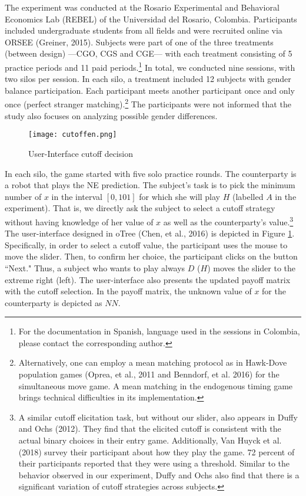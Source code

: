 \documentclass[12pt,english]{article}
\begin{document}
The experiment was conducted at the Rosario Experimental and Behavioral Economics Lab (REBEL) of the Universidad del Rosario, Colombia. Participants included undergraduate students from all fields and were recruited online via ORSEE (Greiner, 2015). Subjects were part of one of the three treatments (between design) ---CGO, CGS and CGE---  with each treatment consisting of 5 practice periods and 11 paid periods.\footnote{For the documentation in Spanish, language used in the sessions in Colombia, please contact the corresponding author.} In total, we conducted nine sessions, with two silos per session. In each silo, a treatment included 12 subjects with gender balance participation. Each participant meets another participant once and only once (perfect stranger matching).\footnote{Alternatively, one can employ a mean matching protocol as in Hawk-Dove population games (Oprea, et al., 2011 and Benndorf, et al. 2016) for the simultaneous move game. A mean matching in the endogenous timing game brings technical difficulties in its implementation.}  The participants were not informed that the study also focuses on analyzing possible gender differences.

\begin{center}
\begin{figure}[ht]
\centering{}%
\texttt{[image: cutoffen.png]}%
\caption{User-Interface cutoff decision} 
\label{fig:ui}
\end{figure}
\end{center}

In each silo, the game started with five solo practice rounds. The counterparty is a robot that plays the NE prediction. The subject's task is to pick the minimum number of $x$ in the interval $[0,101]$ for which she will play $H$ (labelled $A$ in the experiment). That is, we directly ask the subject to select a cutoff strategy without having knowledge of her value of $x$ as well as the counterparty's value.\footnote{A similar cutoff elicitation task, but without our slider, also appears in Duffy and Ochs (2012). They find that the elicited cutoff is consistent with the actual binary choices in their entry game. Additionally, Van Huyck et al. (2018) survey their participant about how they play the game. 72 percent of their participants reported that they were using a threshold. Similar to the behavior observed in our experiment, Duffy and Ochs also find that there is a significant variation of cutoff strategies across subjects. } The user-interface designed in oTree (Chen, et al., 2016) is depicted in Figure \ref{fig:ui}. Specifically, in order to select a cutoff value, the participant uses the mouse to move the slider. Then, to confirm her choice, the participant clicks on the button ``Next." Thus, a subject who wants to play always $D$ ($H$)  moves the slider to the extreme right (left). The user-interface also presents the updated payoff matrix with the cutoff selection. In the payoff matrix, the unknown value of $x$ for the counterparty is depicted as $NN$.
\end{document}

